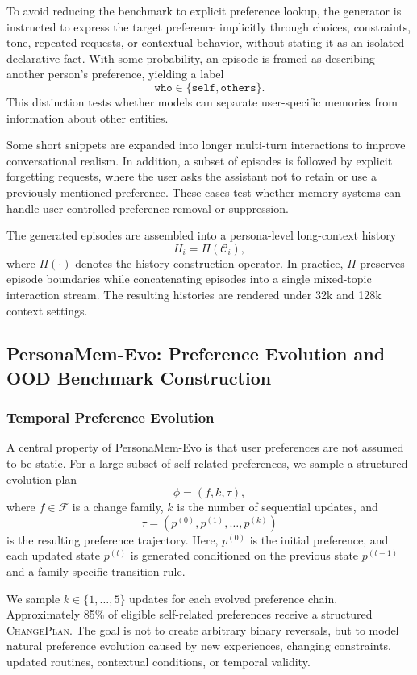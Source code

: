 \documentclass{llmxive}
\begin{document}
To avoid reducing the benchmark to explicit preference lookup, the generator is instructed to express the target preference implicitly through choices, constraints, tone, repeated requests, or contextual behavior, without stating it as an isolated declarative fact. With some probability, an episode is framed as describing another person's preference, yielding a label
\[
\texttt{who} \in \{\texttt{self}, \texttt{others}\}.
\]
This distinction tests whether models can separate user-specific memories from information about other entities.

Some short snippets are expanded into longer multi-turn interactions to improve conversational realism. In addition, a subset of episodes is followed by explicit forgetting requests, where the user asks the assistant not to retain or use a previously mentioned preference. These cases test whether memory systems can handle user-controlled preference removal or suppression.

The generated episodes are assembled into a persona-level long-context history
\[
H_i = \Pi(\mathcal{C}_i),
\]
where $\Pi(\cdot)$ denotes the history construction operator. In practice, $\Pi$ preserves episode boundaries while concatenating episodes into a single mixed-topic interaction stream. The resulting histories are rendered under 32k and 128k context settings.

\subsection{PersonaMem-Evo: Preference Evolution and OOD Benchmark Construction}
\label{app:persona_ood}

\subsubsection{Temporal Preference Evolution}
\label{app:persona_temporal_evolution}
A central property of PersonaMem-Evo is that user preferences are not assumed to be static. For a large subset of self-related preferences, we sample a structured evolution plan
\[
\phi = (f, k, \tau),
\]
where $f \in \mathcal{F}$ is a change family, $k$ is the number of sequential updates, and
\[
\tau = \left(p^{(0)}, p^{(1)}, \ldots, p^{(k)}\right)
\]
is the resulting preference trajectory. Here, $p^{(0)}$ is the initial preference, and each updated state $p^{(t)}$ is generated conditioned on the previous state $p^{(t-1)}$ and a family-specific transition rule.

We sample $k \in \{1,\ldots,5\}$ updates for each evolved preference chain. Approximately 85\% of eligible self-related preferences receive a structured \textsc{ChangePlan}. The goal is not to create arbitrary binary reversals, but to model natural preference evolution caused by new experiences, changing constraints, updated routines, contextual conditions, or temporal validity.
\end{document}
